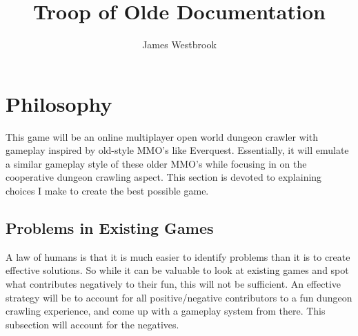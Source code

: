 \documentclass{article}
\title{Troop of Olde Documentation}
\author{James Westbrook}
\begin{document}
\maketitle

\tableofcontents

\pagebreak

\section{Philosophy}
This game will be an online multiplayer open world dungeon crawler with gameplay inspired by old-style MMO's
like Everquest. Essentially, it will emulate a similar gameplay style of these older MMO's while focusing in
on the cooperative dungeon crawling aspect. This section is devoted to explaining choices I make to create the
best possible game.
\subsection{Problems in Existing Games}
A law of humans is that it is much easier to identify problems than it is to create effective solutions.
So while it can be valuable to look at existing games and spot what contributes negatively to their fun,
this will not be sufficient. An effective strategy will be to account for all positive/negative contributors
to a fun dungeon crawling experience, and come up with a gameplay system from there. This subsection
will account for the negatives.
\end{document}
